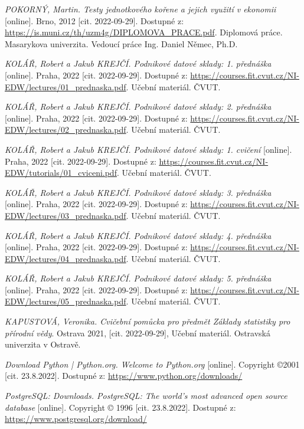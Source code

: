 \documentclass[thesis=M,czech]{FITthesis}[2022/10/08]
\begin{document}
\begin{thebibliography}{99}
 \textit{POKORNÝ, Martin. Testy jednotkového kořene a jejich využití v ekonomii} [online]. Brno, 2012 [cit. 2022-09-29]. Dostupné z: \url{https://is.muni.cz/th/uzm4g/DIPLOMOVA_PRACE.pdf}. Diplomová práce. Masarykova univerzita. Vedoucí práce Ing. Daniel Němec, Ph.D.

 \textit{KOLÁŘ, Robert a Jakub KREJČÍ. Podnikové datové sklady: 1. přednáška} [online]. Praha, 2022 [cit. 2022-09-29]. Dostupné z: \url{https://courses.fit.cvut.cz/NI-EDW/lectures/01_prednaska.pdf}. Učební materiál. ČVUT.

 \textit{KOLÁŘ, Robert a Jakub KREJČÍ. Podnikové datové sklady: 2. přednáška} [online]. Praha, 2022 [cit. 2022-09-29]. Dostupné z: \url{https://courses.fit.cvut.cz/NI-EDW/lectures/02_prednaska.pdf}. Učební materiál. ČVUT.

 \textit{KOLÁŘ, Robert a Jakub KREJČÍ. Podnikové datové sklady: 1. cvičení} [online]. Praha, 2022 [cit. 2022-09-29]. Dostupné z: \url{https://courses.fit.cvut.cz/NI-EDW/tutorials/01_cviceni.pdf}. Učební materiál. ČVUT.

 \textit{KOLÁŘ, Robert a Jakub KREJČÍ. Podnikové datové sklady: 3. přednáška} [online]. Praha, 2022 [cit. 2022-09-29]. Dostupné z: \url{https://courses.fit.cvut.cz/NI-EDW/lectures/03_prednaska.pdf}. Učební materiál. ČVUT.

 \textit{KOLÁŘ, Robert a Jakub KREJČÍ. Podnikové datové sklady: 4. přednáška} [online]. Praha, 2022 [cit. 2022-09-29]. Dostupné z: \url{https://courses.fit.cvut.cz/NI-EDW/lectures/04_prednaska.pdf}. Učební materiál. ČVUT.

 \textit{KOLÁŘ, Robert a Jakub KREJČÍ. Podnikové datové sklady: 5. přednáška} [online]. Praha, 2022 [cit. 2022-09-29]. Dostupné z: \url{https://courses.fit.cvut.cz/NI-EDW/lectures/05_prednaska.pdf}. Učební materiál. ČVUT.

 \textit{KAPUSTOVÁ, Veronika. Cvičební pomůcka pro předmět Základy statistiky pro přírodní vědy}. Ostrava 2021, [cit. 2022-09-29], Učební materiál. Ostravská univerzita v Ostravě.

 \textit{Download Python | Python.org. Welcome to Python.org} [online]. Copyright ©2001 [cit. 23.8.2022]. Dostupné z: \url{https://www.python.org/downloads/}

 \textit{PostgreSQL: Downloads. PostgreSQL: The world's most advanced open source database} [online]. Copyright © 1996 [cit. 23.8.2022]. Dostupné z: \url{https://www.postgresql.org/download/}


\end{thebibliography}
\end{document}
